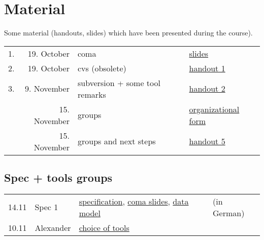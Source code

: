 

\section*{Material}

Some material (handouts, slides) which have been presented during the
course).

\begin{tabular}{r@{\quad\quad}rll}
  \hline
  1. & 19. October & coma  & 
  \href{slides/main-coma.pdf}{slides}
  \\
  2. & 19. October & cvs (obsolete) & \href{handouts/handout1.pdf}{handout 1}
  \\
  3. & 9. November & subversion + some tool remarks &
  \href{handouts/handout2.pdf}{handout 2}
  \\
   & 15. November & groups &
  \href{handouts/handout4.pdf}{organizational form}
  \\
   & 15. November & groups and next steps &
  \href{handouts/handout5.pdf}{handout 5}
  \\
\end{tabular}




\subsection{Spec + tools groups}
\label{sec:material.spec-tools}


\begin{tabular}{llll}
  14.11 & Spec 1 & 
  \href{spec/material/spec1/spezifikation.pdf}{specification}, 
  \href{spec/material/spec1/slides.pdf}{coma slides}, 
  \href{spec/material/spec1/datenmodell.pdf}{data model}
  & (in German)
  \\
  10.11 & Alexander & \href{spec/material/derenbach/tools.pdf}{choice of tools}
\end{tabular}

